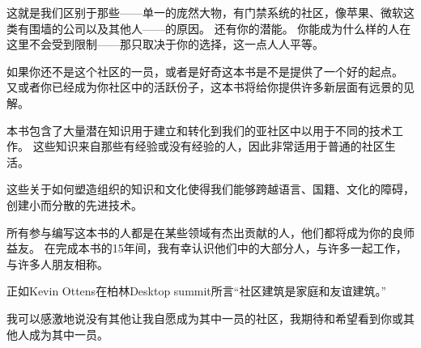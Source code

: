 这就是我们区别于那些——单一的庞然大物，有门禁系统的社区，像苹果、微软这类有围墙的公司以及其他人——的原因。
还有你的潜能。
你能成为什么样的人在这里不会受到限制——那只取决于你的选择，这一点人人平等。

如果你还不是这个社区的一员，或者是好奇这本书是不是提供了一个好的起点。
又或者你已经成为你社区中的活跃份子，这本书将给你提供许多新层面有远景的见解。

本书包含了大量潜在知识用于建立和转化到我们的亚社区中以用于不同的技术工作。
这些知识来自那些有经验或没有经验的人，因此非常适用于普通的社区生活。

这些关于如何塑造组织的知识和文化使得我们能够跨越语言、国籍、文化的障碍，创建小而分散的先进技术。

所有参与编写这本书的人都是在某些领域有杰出贡献的人，他们都将成为你的良师益友。
在完成本书的15年间，我有幸认识他们中的大部分人，与许多一起工作，与许多人朋友相称。

正如Kevin Ottens在柏林Desktop summit所言“社区建筑是家庭和友谊建筑。”

我可以感激地说没有其他让我自愿成为其中一员的社区，我期待和希望看到你或其他人成为其中一员。
